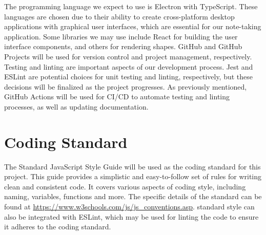 \documentclass{article}
\begin{document}
{%


The programming language we expect to use is Electron with TypeScript. 
These languages are chosen due to their ability to create cross-platform 
desktop applications with graphical user interfaces, which are essential 
for our note-taking application. Some libraries we may use include React 
for building the user interface components, and others for rendering shapes.
 GitHub and GitHub Projects will be used for version control and 
project management, respectively. Testing and linting are important aspects
 of our development process. Jest and ESLint are potential choices 
for unit testing and linting, respectively, but these decisions will be 
finalized as the project progresses. As previously mentioned, GitHub 
Actions will be used for CI/CD to automate testing and linting processes,
 as well as updating documentation.

\section{Coding Standard}


The Standard JavaScript Style Guide will be used as the coding standard for
this project. This guide provides a simplistic and easy-to-follow set of 
rules for writing clean and consistent code. It covers various aspects
of coding style, including naming, variables, functions and more. The specific
details of the standard can be found at 
\url{https://www.w3schools.com/js/js_conventions.asp}. standard style can 
also be integrated with ESLint, which may be used for linting the code 
to ensure it adheres to the coding standard.

}
\end{document}
